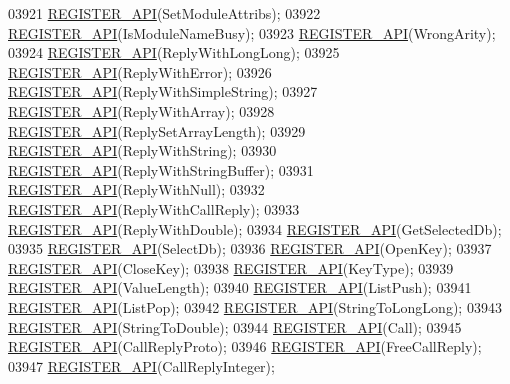 \begin{DoxyCode}
{{{{{{{{{{{{{{{{{{{03921     \hyperlink{module_8c_a38783dad7766982759c7d417a8ab9211}{REGISTER\_API}(SetModuleAttribs);
03922     \hyperlink{module_8c_a38783dad7766982759c7d417a8ab9211}{REGISTER\_API}(IsModuleNameBusy);
03923     \hyperlink{module_8c_a38783dad7766982759c7d417a8ab9211}{REGISTER\_API}(WrongArity);
03924     \hyperlink{module_8c_a38783dad7766982759c7d417a8ab9211}{REGISTER\_API}(ReplyWithLongLong);
03925     \hyperlink{module_8c_a38783dad7766982759c7d417a8ab9211}{REGISTER\_API}(ReplyWithError);
03926     \hyperlink{module_8c_a38783dad7766982759c7d417a8ab9211}{REGISTER\_API}(ReplyWithSimpleString);
03927     \hyperlink{module_8c_a38783dad7766982759c7d417a8ab9211}{REGISTER\_API}(ReplyWithArray);
03928     \hyperlink{module_8c_a38783dad7766982759c7d417a8ab9211}{REGISTER\_API}(ReplySetArrayLength);
03929     \hyperlink{module_8c_a38783dad7766982759c7d417a8ab9211}{REGISTER\_API}(ReplyWithString);
03930     \hyperlink{module_8c_a38783dad7766982759c7d417a8ab9211}{REGISTER\_API}(ReplyWithStringBuffer);
03931     \hyperlink{module_8c_a38783dad7766982759c7d417a8ab9211}{REGISTER\_API}(ReplyWithNull);
03932     \hyperlink{module_8c_a38783dad7766982759c7d417a8ab9211}{REGISTER\_API}(ReplyWithCallReply);
03933     \hyperlink{module_8c_a38783dad7766982759c7d417a8ab9211}{REGISTER\_API}(ReplyWithDouble);
03934     \hyperlink{module_8c_a38783dad7766982759c7d417a8ab9211}{REGISTER\_API}(GetSelectedDb);
03935     \hyperlink{module_8c_a38783dad7766982759c7d417a8ab9211}{REGISTER\_API}(SelectDb);
03936     \hyperlink{module_8c_a38783dad7766982759c7d417a8ab9211}{REGISTER\_API}(OpenKey);
03937     \hyperlink{module_8c_a38783dad7766982759c7d417a8ab9211}{REGISTER\_API}(CloseKey);
03938     \hyperlink{module_8c_a38783dad7766982759c7d417a8ab9211}{REGISTER\_API}(KeyType);
03939     \hyperlink{module_8c_a38783dad7766982759c7d417a8ab9211}{REGISTER\_API}(ValueLength);
03940     \hyperlink{module_8c_a38783dad7766982759c7d417a8ab9211}{REGISTER\_API}(ListPush);
03941     \hyperlink{module_8c_a38783dad7766982759c7d417a8ab9211}{REGISTER\_API}(ListPop);
03942     \hyperlink{module_8c_a38783dad7766982759c7d417a8ab9211}{REGISTER\_API}(StringToLongLong);
03943     \hyperlink{module_8c_a38783dad7766982759c7d417a8ab9211}{REGISTER\_API}(StringToDouble);
03944     \hyperlink{module_8c_a38783dad7766982759c7d417a8ab9211}{REGISTER\_API}(Call);
03945     \hyperlink{module_8c_a38783dad7766982759c7d417a8ab9211}{REGISTER\_API}(CallReplyProto);
03946     \hyperlink{module_8c_a38783dad7766982759c7d417a8ab9211}{REGISTER\_API}(FreeCallReply);
03947     \hyperlink{module_8c_a38783dad7766982759c7d417a8ab9211}{REGISTER\_API}(CallReplyInteger);
}}}}}}}}}}}}}}}}}}}
\end{DoxyCode}
